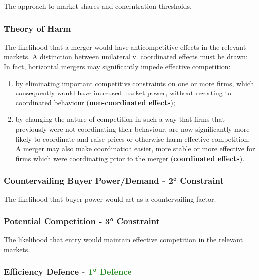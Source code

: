             The approach to market shares and concentration thresholds.

        \subsubsection{Theory of Harm}

            The likelihood that a merger would have anticompetitive effects in the relevant markets. A distinction between unilateral v. coordinated effects must be drawn: In fact, horizontal mergers may significantly impede effective competition:
            \begin{enumerate}[label=\roman*.]
                \item by eliminating important competitive constraints on one or more firms, which consequently would have increased market power, without resorting to coordinated behaviour (\textbf{non-coordinated effects});
                \item by changing the nature of competition in such a way that firms that previously were not coordinating their behaviour, are now significantly more likely to coordinate and raise prices or otherwise harm effective competition. A merger may also make coordination easier, more stable or more effective for firms which were coordinating prior to the merger (\textbf{coordinated effects}).
            \end{enumerate}

        \subsubsection{Countervailing Buyer Power/Demand - \textcolor{BrickRed}{2° Constraint}}

            The likelihood that buyer power would act as a countervailing factor.

        \subsubsection{Potential Competition - \textcolor{BrickRed}{3° Constraint}}

            The likelihood that entry would maintain effective competition in the relevant markets.

        \subsubsection{Efficiency Defence - \textcolor{ForestGreen}{1° Defence}}

